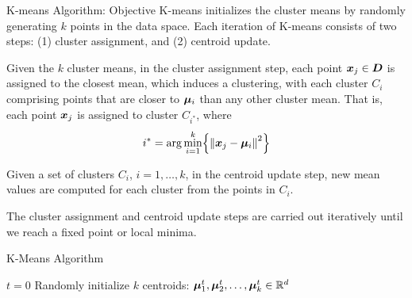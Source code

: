 \begin{frame}{K-means Algorithm: Objective}
K-means initializes the cluster means by randomly generating $k$
points in the data space. 
Each iteration of K-means consists of two steps: (1) cluster
assignment, and (2) centroid update. 

\medskip
Given the $k$ cluster means,
in the cluster assignment step, each point ${\boldsymbol x}_{j} \in {\boldsymbol D}$ is
assigned to the closest mean, which induces a clustering, with
each cluster $C_i$ comprising points that are closer to ${\bm \mu}_i$
than any other cluster mean. That is, each point ${\boldsymbol x}_{j}$ is
assigned to cluster $C_{i^*}$, where
\begin{align*}
i^* = \arg \min_{i=1}^k \Bigl\{\left\lVert{\boldsymbol x}_{j} - {\bm \mu}_i\right\rVert^2\Bigr\}
\end{align*}

\medskip
Given a set of clusters $C_i$, $i=1,\dots,k$, in the centroid
update step, new mean values are computed for each
cluster from the points in $C_i$.

\medskip
The cluster assignment and centroid update
steps are
carried out iteratively until we reach a f\/{i}xed point or local
minima. 
\end{frame}


\begin{frame}[fragile]{K-Means Algorithm}
\begin{tightalgo}[H]{\textwidth-18pt}
\Algorithm{}
$t = 0$\;
Randomly initialize $k$ centroids: ${\bm \mu}_1^t, {\bm \mu}_2^t, \dots,
{\bm \mu}_k^t \in {\mathord{\mathbb R}}^d$\;
\end{tightalgo}
\end{frame}


